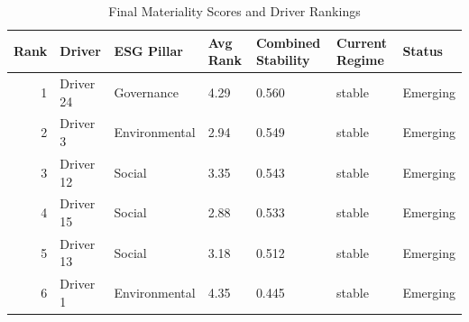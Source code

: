 \begin{table}
\caption{Final Materiality Scores and Driver Rankings}
\label{tab:final_materiality}
\begin{tabular}{rllllll}
\toprule
Rank & Driver & ESG Pillar & Avg Rank & Combined Stability & Current Regime & Status \\
\midrule
1 & Driver 24 & Governance & 4.29 & 0.560 & stable & Emerging \\
2 & Driver 3 & Environmental & 2.94 & 0.549 & stable & Emerging \\
3 & Driver 12 & Social & 3.35 & 0.543 & stable & Emerging \\
4 & Driver 15 & Social & 2.88 & 0.533 & stable & Emerging \\
5 & Driver 13 & Social & 3.18 & 0.512 & stable & Emerging \\
6 & Driver 1 & Environmental & 4.35 & 0.445 & stable & Emerging \\
\bottomrule
\end{tabular}
\end{table}
